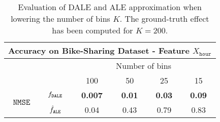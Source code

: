 \begin{table}
  \caption{Evaluation of DALE and ALE approximation when lowering the
    number of bins \(K\). The ground-truth effect has been computed
    for \(K=200\).}
  \label{tab:bike-sharing-accuracy}
  \centering
  \begin{tabular}{c|c|c|c|c|c}
    \multicolumn{6}{c}{Accuracy on Bike-Sharing Dataset - Feature \(X_{\mathtt{hour}}\)} \\
    \hline \hline
    & & \multicolumn{4}{|c}{Number of bins} \\
    \hline
    & & 100 & 50 & 25 & 15 \\
    \hline
    \hline
    \multirow{2}{*}{\(\mathtt{NMSE}\)} & \(f_{\mathtt{DALE}}\) & \textbf{0.007} & \textbf{0.01} & \textbf{0.03} & \textbf{0.09} \\
    & \(\hat{f}_{\mathtt{ALE}}\) & 0.04 & 0.43 & 0.79 & 0.83 \\
    \hline
  \end{tabular}
\end{table}
